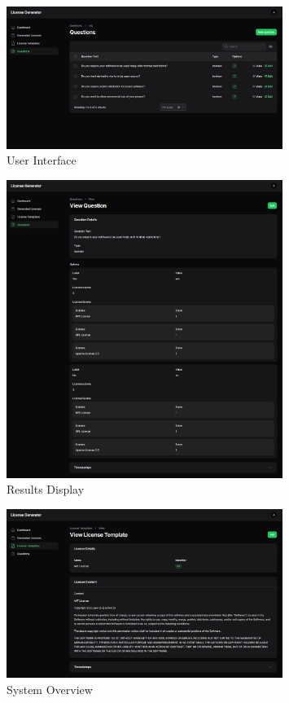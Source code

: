 \documentclass[12pt,a4paper]{report}
\begin{document}
\begin{figure}[H]
    \centering
    \includegraphics[width=0.8\textwidth]{Screenshots/os7.png}
    \caption{User Interface}
\end{figure}

\begin{figure}[H]
    \centering
    \includegraphics[width=0.8\textwidth]{Screenshots/os8.png}
    \caption{Results Display}
\end{figure}

\begin{figure}[H]
    \centering
    \includegraphics[width=0.8\textwidth]{Screenshots/os9.png}
    \caption{System Overview}
\end{figure}
\end{document}
